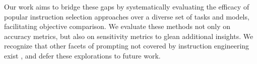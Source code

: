 Our work aims to bridge these gaps by systematically evaluating the efficacy of popular instruction selection approaches over a diverse set of tasks and models, facilitating objective comparison. We evaluate these methods not only on accuracy metrics, but also on sensitivity metrics to glean additional insights. We recognize that other facets of prompting not covered by instruction engineering exist \cite{weichain, react, selfconsistency}, and defer these explorations to future work. 